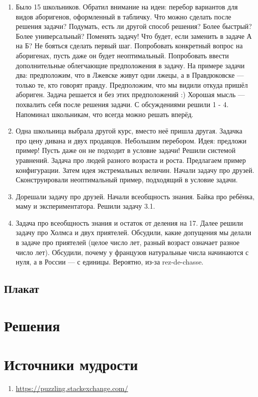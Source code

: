 \documentclass[12pt]{article}
\newcounter{problem}[section]
\theoremstyle{definition}
\begin{document}
\begin{enumerate}
  \item Было 15 школьников. Обратил внимание на идеи: перебор вариантов для 
  видов аборигенов, оформленный в табличку. Что можно сделать после решения задачи?
  Подумать, есть ли другой способ решения? Более быстрый? Более универсальный?
  Поменять задачу! Что будет, если заменить в задаче А на Б? 
  Не бояться сделать первый шаг. Попробовать конкретный вопрос на аборигенах,
  пусть даже он будет неоптимальный. Попробовать ввести дополнительные облегчающие предположения в задачу.
  На примере задачи два: предположим, что в Лжевске живут одни лжецы, а в Правдюковске — только те, кто говорят правду. 
  Предположим, что мы видили откуда пришёл абориген. Задача решается и без этих предположений :)
  Хорошая мысль — похвалить себя после решения задачи. С обсуждениями решили 1 - 4. Напоминал школьникам, что всегда можно решать вперёд. 
  \item Одна школьница выбрала другой курс, вместо неё пришла другая. Задачка про цену дивана и двух продавцов. Небольшим перебором. Идея: предложи пример! Пусть даже он не подходит
  в условие задачи! Решили системой уравнений. 
  Задача про людей разного возраста и роста. Предлагаем пример конфигурации. Затем идея экстремальных величин.
  Начали задачу про друзей. Сконструировали неоптимальный пример, подходящий в условие задачи. 
  \item Дорешали задачу про друзей. Начали всеобщность знания. Байка про ребёнка, маму и экспериментатора. Решили задачу 3.1. 
  \item Задача про всеобщность знания и остаток от деления на 17. Далее решили задачу про Холмса и двух приятелей.
  Обсудили, какие допущения мы делали в задаче про приятелей (целое число лет, разный возраст означает разное число лет).
  Обсудили, почему у французов натуральные числа начинаются с нуля, а в России — с единицы. Вероятно, из-за rez-de-chasse. 

\end{enumerate}

\subsection{Плакат}






\renewenvironment{solution}[1]{%
         \vskip .5cm plus 2cm minus 0.1cm%
         {\bfseries \hyperlink{problem:#1}{#1.}}%
}%
{%
}%



\section{Решения}



\section{Источники мудрости}


\begin{enumerate}
\item \url{https://puzzling.stackexchange.com/}
\end{enumerate}

\printbibliography[heading=none]
\end{document}
